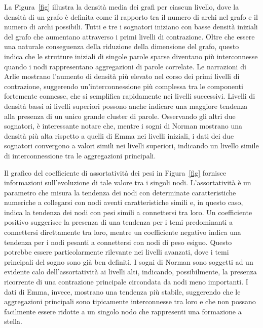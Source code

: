 La Figura~\ref{fig} illustra la densità media dei grafi per ciascun livello, dove la densità di un grafo è definita
come il rapporto tra il numero di archi nel grafo e il numero di archi possibili.
Tutti e tre i sognatori iniziano con basse densità iniziali del grafo che aumentano attraverso i primi livelli di
contrazione.
Oltre che essere una naturale conseguenza della riduzione della dimensione del grafo, questo indica che le strutture
iniziali di singole parole sparse diventano più interconnesse quando i nodi rappresentano aggregazioni di parole
correlate.
Le narrazioni di Arlie mostrano l'aumento di densità più elevato nel corso dei primi livelli di contrazione,
suggerendo un'interconnessione più complessa tra le componenti fortemente connesse, che si semplifica
rapidamente nei livelli successivi.
Livelli di densità bassi ai livelli superiori possono anche indicare una maggiore tendenza alla presenza di
un unico grande cluster di parole.
Osservando gli altri due sognatori, è interessante notare che, mentre i sogni di Norman mostrano una densità più alta
rispetto a quelli di Emma nei livelli iniziali, i dati dei due sognatori convergono a valori simili nei livelli
superiori, indicando un livello simile di interconnessione tra le aggregazioni principali.

Il grafico del coefficiente di assortatività dei pesi in Figura~\ref{fig} fornisce informazioni sull'evoluzione
di tale valore tra i singoli nodi.
L'assortatività è un parametro che misura la tendenza dei nodi con determinate caratteristiche numeriche a collegarsi
con nodi aventi caratteristiche simili e, in questo caso, indica la tendenza dei nodi con pesi simili a connettersi tra
loro.
Un coefficiente positivo suggerisce la presenza di una tendenza per i temi predominanti a connettersi direttamente
tra loro, mentre un coefficiente negativo indica una tendenza per i nodi pesanti a connettersi con nodi di peso esiguo.
Questo potrebbe essere particolarmente rilevante nei livelli avanzati, dove i temi principali del sogno sono già ben
definiti.
I sogni di Norman sono soggetti ad un evidente calo dell'assortatività ai livelli alti, indicando, possibilmente,
la presenza ricorrente di una contrazione principale circondata da nodi meno importanti.
I dati di Emma, invece, mostrano una tendenza più stabile, suggerendo che le aggregazioni principali sono tipicamente
interconnesse tra loro e che non possano facilmente essere ridotte a un singolo nodo che rappresenti una formazione a
stella.


